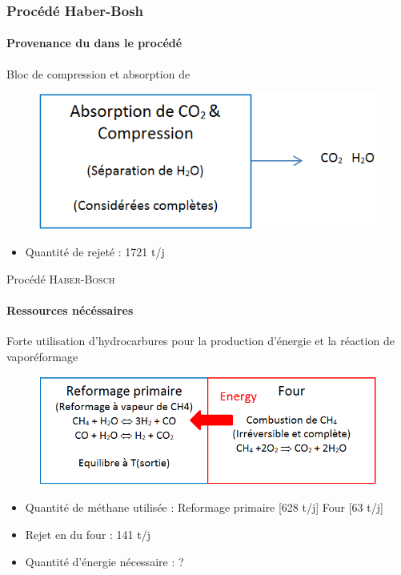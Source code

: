 \documentclass{beamer}
\begin{document}
\begin{frame}
\frametitle{Procédé Haber-Bosh}
\framesubtitle{Provenance du  dans le procédé}

Bloc de compression et absorption de 

\begin{figure} [ht!]
\centering
\includegraphics[scale=0.6] {Bloc_compression.png}
\end {figure}
\begin{itemize}
\item {Quantité de  rejeté : 1721 t/j }
\end{itemize}
\end{frame}



\begin{frame}{Procédé \textsc{Haber-Bosch}}
\framesubtitle{Ressources nécéssaires}

Forte utilisation d'hydrocarbures pour la production d'énergie et la réaction de vaporéformage
\begin{figure} [ht!]
\centering
\includegraphics[scale=0.4] {energie.png}
\end{figure}
\begin{itemize}
\item {Quantité de méthane utilisée : Reformage primaire [628 t/j]  Four [63 t/j]}
\item {Rejet en  du four : 141 t/j}
\item {Quantité d'énergie nécessaire : ?}
\end{itemize}
\end{frame}
\end{document}
